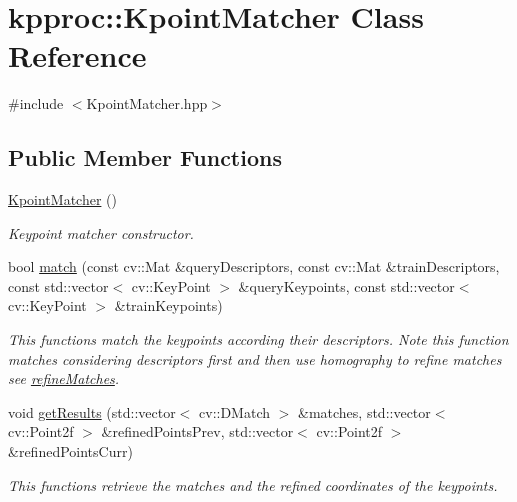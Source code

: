 \hypertarget{classkpproc_1_1KpointMatcher}{}\section{kpproc\+:\+:Kpoint\+Matcher Class Reference}
\label{classkpproc_1_1KpointMatcher}


{\ttfamily \#include $<$Kpoint\+Matcher.\+hpp$>$}

\subsection*{Public Member Functions}
\begin{DoxyCompactItemize}
\item 
\hyperlink{classkpproc_1_1KpointMatcher_a4a40c73477a60c38e5f12ed6f204ab9a}{Kpoint\+Matcher} ()
\begin{DoxyCompactList}\small\item\em Keypoint matcher constructor. \end{DoxyCompactList}\item 
bool \hyperlink{classkpproc_1_1KpointMatcher_a21caea2a00576784b2fc90dd652870ed}{match} (const cv\+::\+Mat \&query\+Descriptors, const cv\+::\+Mat \&train\+Descriptors, const std\+::vector$<$ cv\+::\+Key\+Point $>$ \&query\+Keypoints, const std\+::vector$<$ cv\+::\+Key\+Point $>$ \&train\+Keypoints)
\begin{DoxyCompactList}\small\item\em This functions match the keypoints according their descriptors. Note this function matches considering descriptors first and then use homography to refine matches see \hyperlink{classkpproc_1_1KpointMatcher_a0d1681f55cfeea8a51bba9ccac41d346}{refine\+Matches}. \end{DoxyCompactList}\item 
void \hyperlink{classkpproc_1_1KpointMatcher_a02f6944a8401a2a14bb5ce42073389b0}{get\+Results} (std\+::vector$<$ cv\+::\+D\+Match $>$ \&matches, std\+::vector$<$ cv\+::\+Point2f $>$ \&refined\+Points\+Prev, std\+::vector$<$ cv\+::\+Point2f $>$ \&refined\+Points\+Curr)
\begin{DoxyCompactList}\small\item\em This functions retrieve the matches and the refined coordinates of the keypoints. \end{DoxyCompactList}\end{DoxyCompactItemize}
